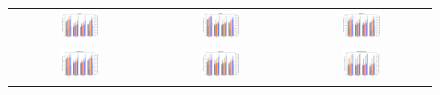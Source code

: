 \begin{figure}[t]
\begin{tabular}{c c c}
    \includegraphics[width = 0.3\textwidth]{figures/grad_sign_perturbation/vgg16_eps003.png} &
    \includegraphics[width = 0.3\textwidth]{figures/grad_sign_perturbation/alexnet_eps003.png} &
    \includegraphics[width = 0.3\textwidth]{figures/grad_sign_perturbation/resnet18_eps003.png} \\

    \includegraphics[width = 0.3\textwidth]{figures/grad_sign_perturbation/densenet161_eps003.png} &
    \includegraphics[width = 0.3\textwidth]{figures/grad_sign_perturbation/googlenet_eps003.png} &
    \includegraphics[width = 0.3\textwidth]{figures/grad_sign_perturbation/mobilenetv3large_eps003.png} \\


\end{tabular}
\end{figure}
